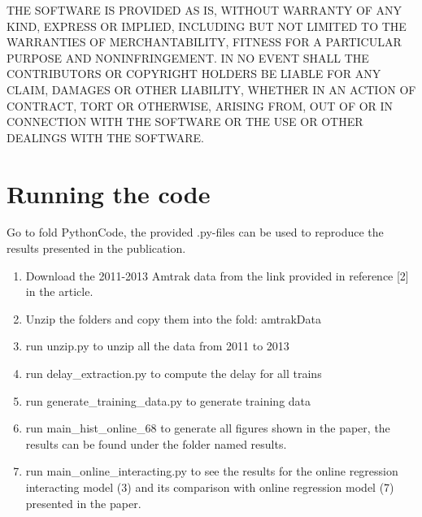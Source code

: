 \documentclass[english]{article}
\begin{document}
THE SOFTWARE IS PROVIDED \textquotedbl{}AS IS\textquotedbl{}, WITHOUT
WARRANTY OF ANY KIND, EXPRESS OR IMPLIED, INCLUDING BUT NOT LIMITED
TO THE WARRANTIES OF MERCHANTABILITY, FITNESS FOR A PARTICULAR PURPOSE
AND NONINFRINGEMENT. IN NO EVENT SHALL THE CONTRIBUTORS OR COPYRIGHT
HOLDERS BE LIABLE FOR ANY CLAIM, DAMAGES OR OTHER LIABILITY, WHETHER
IN AN ACTION OF CONTRACT, TORT OR OTHERWISE, ARISING FROM, OUT OF
OR IN CONNECTION WITH THE SOFTWARE OR THE USE OR OTHER DEALINGS WITH
THE SOFTWARE.





\section{Running the code}
Go to fold PythonCode, the provided .py-files can be used to reproduce the results presented in the publication.
\begin{enumerate}
\item Download the 2011-2013 Amtrak data from the link provided in reference [2] in the article.

\item Unzip the folders and copy them into the fold: amtrakData

\item run unzip.py to unzip all the data from 2011 to 2013

\item run delay\_extraction.py to compute the delay for all trains

\item run generate\_training\_data.py to generate training data

\item run main\_hist\_online\_68 to generate all figures shown in the paper, the results can be found under the folder named results.

\item run main\_online\_interacting.py to see the results for the online regression interacting model (3) and its comparison with online regression model (7) presented in the paper. 

\end{enumerate}
\end{document}
